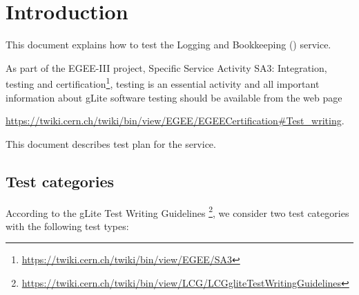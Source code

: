 \section{Introduction}

This document explains how to test the Logging and Bookkeeping (\LB) service.

As part of the EGEE-III project, Specific Service Activity SA3: Integration,
testing and certification\footnote{\url{https://twiki.cern.ch/twiki/bin/view/EGEE/SA3}},
testing is an essential activity and all important information about gLite software
testing should be available from the web page

\begin{center}
\url{https://twiki.cern.ch/twiki/bin/view/EGEE/EGEECertification#Test_writing}.
\end{center}

This document describes test plan for the \LB service.


\subsection{Test categories}

%

According to the gLite Test Writing Guidelines
\footnote{\url{https://twiki.cern.ch/twiki/bin/view/LCG/LCGgliteTestWritingGuidelines}},
we consider two test categories with the following test types:

